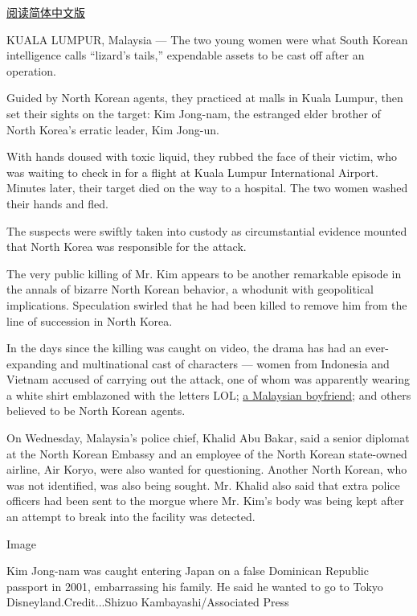 \href{http://cn.nytimes3xbfgragh.onion/asia-pacific/20170223/kim-jong-nam-assassination-korea-malaysia/}{阅读简体中文版}

KUALA LUMPUR, Malaysia --- The two young women were what South Korean
intelligence calls ``lizard's tails,'' expendable assets to be cast off
after an operation.

Guided by North Korean agents, they practiced at malls in Kuala Lumpur,
then set their sights on the target: Kim Jong-nam, the estranged elder
brother of North Korea's erratic leader, Kim Jong-un.

With hands doused with toxic liquid, they rubbed the face of their
victim, who was waiting to check in for a flight at Kuala Lumpur
International Airport. Minutes later, their target died on the way to a
hospital. The two women washed their hands and fled.

The suspects were swiftly taken into custody as circumstantial evidence
mounted that North Korea was responsible for the attack.

The very public killing of Mr. Kim appears to be another remarkable
episode in the annals of bizarre North Korean behavior, a whodunit with
geopolitical implications. Speculation swirled that he had been killed
to remove him from the line of succession in North Korea.

In the days since the killing was caught on video, the drama has had an
ever-expanding and multinational cast of characters --- women from
Indonesia and Vietnam accused of carrying out the attack, one of whom
was apparently wearing a white shirt emblazoned with the letters LOL;
\href{https://www.nytimes3xbfgragh.onion/2017/02/15/world/asia/kim-jong-un-brother-assassination-north-korea.html}{a
Malaysian boyfriend}; and others believed to be North Korean agents.

On Wednesday, Malaysia's police chief, Khalid Abu Bakar, said a senior
diplomat at the North Korean Embassy and an employee of the North Korean
state-owned airline, Air Koryo, were also wanted for questioning.
Another North Korean, who was not identified, was also being sought. Mr.
Khalid also said that extra police officers had been sent to the morgue
where Mr. Kim's body was being kept after an attempt to break into the
facility was detected.

Image

Kim Jong-nam was caught entering Japan on a false Dominican Republic
passport in 2001, embarrassing his family. He said he wanted to go to
Tokyo Disneyland.Credit...Shizuo Kambayashi/Associated Press

